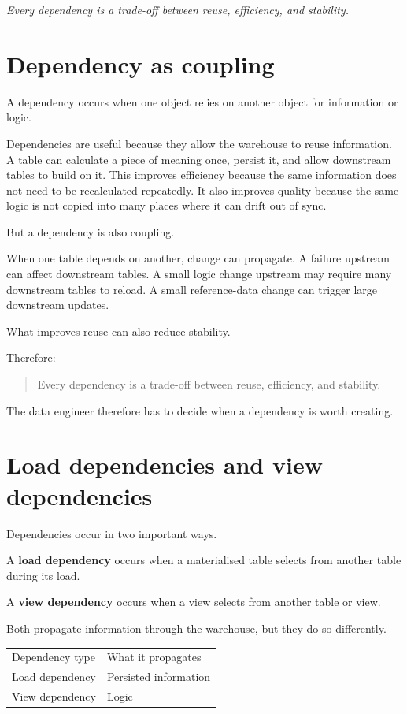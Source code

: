 \documentclass[10pt,openany,10pt]{book}
\newcounter{none}
\let\podeToprule\toprule
\let\podeMidrule\midrule
\let\podeBottomrule\bottomrule
\renewcommand{\toprule}{\arrayrulecolor{pbiGrid}\podeToprule}
\renewcommand{\midrule}{\arrayrulecolor{pbiGrid}\podeMidrule}
\renewcommand{\bottomrule}{\arrayrulecolor{pbiGrid}\podeBottomrule}
\begin{document}
\emph{Every dependency is a trade-off between reuse, efficiency, and
stability.}

\section{Dependency as coupling}\label{dependency-as-coupling}

A dependency occurs when one object relies on another object for
information or logic.

Dependencies are useful because they allow the warehouse to reuse
information. A table can calculate a piece of meaning once, persist it,
and allow downstream tables to build on it. This improves efficiency
because the same information does not need to be recalculated
repeatedly. It also improves quality because the same logic is not
copied into many places where it can drift out of sync.

But a dependency is also coupling.

When one table depends on another, change can propagate. A failure
upstream can affect downstream tables. A small logic change upstream may
require many downstream tables to reload. A small reference-data change
can trigger large downstream updates.

What improves reuse can also reduce stability.

Therefore:

\begin{quote}
Every dependency is a trade-off between reuse, efficiency, and
stability.
\end{quote}

The data engineer therefore has to decide when a dependency is worth
creating.

\section{Load dependencies and view
dependencies}\label{load-dependencies-and-view-dependencies}

Dependencies occur in two important ways.

A \textbf{load dependency} occurs when a materialised table selects from
another table during its load.

A \textbf{view dependency} occurs when a view selects from another table
or view.

Both propagate information through the warehouse, but they do so
differently.

{\def\LTcaptype{none} %
\begin{longtable}[]{@{}ll@{}}
\toprule\noalign{}
Dependency type & What it propagates \\
\midrule\noalign{}
\endhead
\bottomrule\noalign{}
\endlastfoot
Load dependency & Persisted information \\
View dependency & Logic \\
\end{longtable}
}
\end{document}
